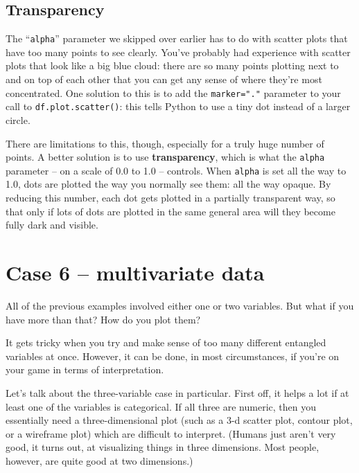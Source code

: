 \subsection{Transparency}


The ``\texttt{alpha}'' parameter we skipped over earlier has to do with scatter
plots that have too many points to see clearly. You've probably had experience
with scatter plots that look like a big blue cloud: there are so many points
plotting next to and on top of each other that you can get any sense of where
they're most concentrated. One solution to this is to add the
\texttt{marker="."} parameter to your call to \texttt{df.plot.scatter()}: this
tells Python to use a tiny dot instead of a larger circle.


There are limitations to this, though, especially for a truly huge number of
points. A better solution is to use \textbf{transparency}, which is what the
\texttt{alpha} parameter -- on a scale of 0.0 to 1.0 -- controls. When
\texttt{alpha} is set all the way to 1.0, dots are plotted the way you normally
see them: all the way opaque. By reducing this number, each dot gets plotted in
a partially transparent way, so that only if lots of dots are plotted in the
same general area will they become fully dark and visible.



\section{Case 6 -- multivariate data}

All of the previous examples involved either one or two variables. But what if
you have more than that? How do you plot them?

It gets tricky when you try and make sense of too many different entangled
variables at once. However, it can be done, in most circumstances, if you're on
your game in terms of interpretation.

Let's talk about the three-variable case in particular. First off, it helps a
lot if at least one of the variables is categorical. If all three are numeric,
then you essentially need a three-dimensional plot (such as a 3-d scatter plot,
contour plot, or a wireframe plot) which are difficult to interpret. (Humans
just aren't very good, it turns out, at visualizing things in three dimensions.
Most people, however, are quite good at two dimensions.)


